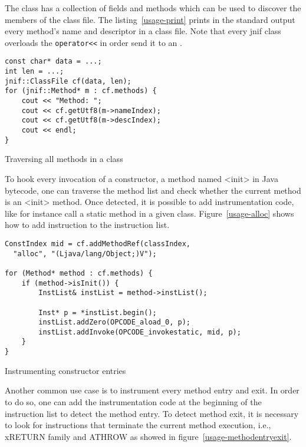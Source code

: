 The  class has a collection of fields and methods which can be used to discover the members of the class file. 
The listing~\ref{usage-print} prints in the standard output every method's name and descriptor in a class file. 
Note that every jnif class overloads the \verb|operator<<| in order send it to an .

\begin{listing}
\begin{verbatim}
const char* data = ...;
int len = ...;
jnif::ClassFile cf(data, len);
for (jnif::Method* m : cf.methods) {
	cout << "Method: ";
	cout << cf.getUtf8(m->nameIndex);
	cout << cf.getUtf8(m->descIndex);
	cout << endl;
}
\end{verbatim}
\caption{Traversing all methods in a class}
\label{usage-print}
\end{listing}

To hook every invocation of a constructor, a method named <init> in Java bytecode, 
one can traverse the method list and check whether the current method is an <init> method. 
Once detected, it is possible to add instrumentation code, like for instance call a static method in a given class. 
Figure~\ref{usage-alloc} shows how to add instruction to the instruction list.

\begin{listing}
\begin{verbatim}
ConstIndex mid = cf.addMethodRef(classIndex, 
  "alloc", "(Ljava/lang/Object;)V");

for (Method* method : cf.methods) {
	if (method->isInit()) {
		InstList& instList = method->instList();

		Inst* p = *instList.begin();
		instList.addZero(OPCODE_aload_0, p);
		instList.addInvoke(OPCODE_invokestatic, mid, p);
	}
}
\end{verbatim}
\caption{Instrumenting constructor entries}
\label{usage-alloc}
\end{listing}

Another common use case is to instrument every method entry and exit. In order to do so, one can add the instrumentation code at the beginning of the instruction list to detect the method entry. To detect method exit, it is necessary to look for instructions that terminate the current method execution, i.e., xRETURN family and ATHROW as showed in figure~\ref{usage-methodentryexit}.

